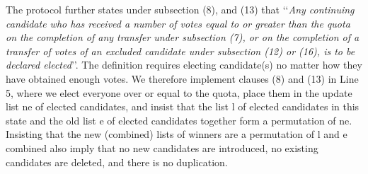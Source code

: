\documentclass{llncs}
\begin{document}
The protocol further states under subsection (8), and (13) that \lq\lq \emph{Any continuing candidate who has received a number of votes equal to
or greater than the quota on the completion of any transfer under subsection (7), or on the completion of a transfer of votes of an
excluded candidate under subsection (12) or (16), is to be declared elected}\rq\rq. 
The definition requires electing candidate(s) no matter how they
have obtained enough votes. We therefore implement clauses (8) and
(13) in Line 5, where we elect everyone over or equal to the quota,
place them in the update list {\selectfont ne} of
elected candidates, 
and insist that the list {\selectfont l}  of elected
candidates in this state and 
the old list {\selectfont e} of elected candidates together form a
permutation of {\selectfont ne}. Insisting that the
new (combined) lists of winners are a permutation of
{\selectfont l} and {\selectfont e}
combined also imply that no new candidates are introduced, no
existing candidates are deleted, and there is no duplication. 
\end{document}

